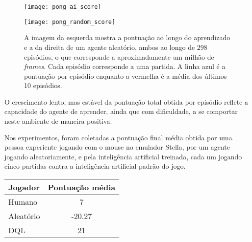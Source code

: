 \begin{figure}[h!]
  \begin{minipage}[b]{.5\textwidth}
  \centering
  \texttt{[image: pong\_ai\_score]}
  \end{minipage}
  \hfill
  \begin{minipage}[b]{.5\textwidth}
  \centering
  \texttt{[image: pong\_random\_score]}
  \end{minipage}
  \caption{A imagem da esquerda mostra a pontuação ao longo do aprendizado e a da direita de um agente aleatório, ambos ao longo de 298 episódios, o que corresponde a aproximadamente um milhão de \textit{frames}. Cada episódio corresponde a uma partida. A linha azul é a pontuação por episódio enquanto a vermelha é a média dos últimos 10 episódios.}
  \label{fig:pong_score}
\end{figure}


O crescimento lento, mas estável da pontuação total obtida por episódio reflete a capacidade do agente de aprender, ainda que com dificuldade, a se comportar neste ambiente de maneira positiva.

Nos experimentos, foram coletadas a pontuação final média obtida por uma pessoa experiente jogando com o mouse no emulador Stella, por um agente jogando aleatoriamente, e pela inteligência artificial treinada, cada um jogando cinco partidas contra a inteligência artificial padrão do jogo.

\begin{center}
\begin{tabular}{l c}
\hline
Jogador & Pontuação média \\
\hline
Humano & 7 \\
Aleatório & -20.27 \\
DQL & 21 \\
\hline
\end{tabular}
\label{table:pong_score}
\end{center}

